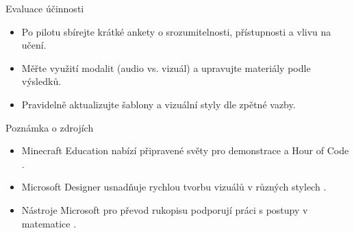 Evaluace účinnosti
\begin{itemize}
  \item Po pilotu sbírejte krátké ankety o srozumitelnosti, přístupnosti a vlivu na učení.
  \item Měřte využití modalit (audio vs. vizuál) a upravujte materiály podle výsledků.
  \item Pravidelně aktualizujte šablony a vizuální styly dle zpětné vazby.
\end{itemize}

Poznámka o zdrojích
\begin{itemize}
  \item Minecraft Education nabízí připravené světy pro demonstrace a Hour of Code \cite{kb_ai_101_tipu_pdf_04e4a115_page_15_2}.
  \item Microsoft Designer usnadňuje rychlou tvorbu vizuálů v různých stylech \cite{kb_ai_101_tipu_pdf_04e4a115_page_51_1}.
  \item Nástroje Microsoft pro převod rukopisu podporují práci s postupy v matematice \cite{kb_ai_101_tipu_pdf_04e4a115_page_8_1}.
\end{itemize}
